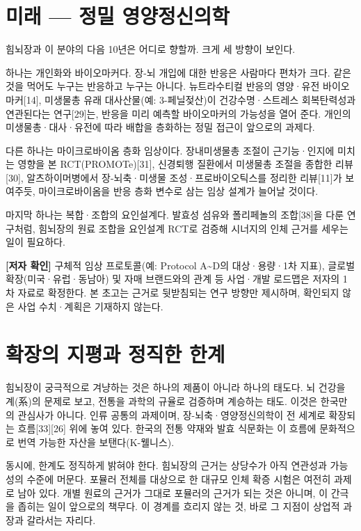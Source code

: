\documentclass[12pt,oneside]{book}
\newenvironment{authnote}
  {\par\smallskip\begingroup\leftskip=6mm\rightskip=3mm\small\color{muted}\noindent\ignorespaces}
  {\par\endgroup\smallskip}
\begin{document}
\section{미래 — 정밀 영양정신의학}

힘뇌장과 이 분야의 다음 10년은 어디로 향할까. 크게 세 방향이 보인다.

하나는 개인화와 바이오마커다. 장-뇌 개입에 대한 반응은 사람마다 편차가 크다. 같은 것을 먹어도 누구는 반응하고 누구는 아니다. 뉴트라수티컬 반응의 영양·유전 바이오마커[14], 미생물총 유래 대사산물(예: 3-페닐젖산)이 건강수명·스트레스 회복탄력성과 연관된다는 연구[29]는, 반응을 미리 예측할 바이오마커의 가능성을 열어 준다. 개인의 미생물총·대사·유전에 따라 배합을 층화하는 정밀 접근이 앞으로의 과제다.

다른 하나는 마이크로바이옴 층화 임상이다. 장내미생물총 조절이 근기능·인지에 미치는 영향을 본 RCT(PROMOTe)[31], 신경퇴행 질환에서 미생물총 조절을 종합한 리뷰[30], 알츠하이머병에서 장-뇌축·미생물 조성·프로바이오틱스를 정리한 리뷰[11]가 보여주듯, 마이크로바이옴을 반응 층화 변수로 삼는 임상 설계가 늘어날 것이다.

마지막 하나는 복합·조합의 요인설계다. 발효성 섬유와 폴리페놀의 조합[38]을 다룬 연구처럼, 힘뇌장의 원료 조합을 요인설계 RCT로 검증해 시너지의 인체 근거를 세우는 일이 필요하다.

\begin{authnote}\textbf{[저자 확인]} 구체적 임상 프로토콜(예: Protocol A\textasciitilde{}D의 대상·용량·1차 지표), 글로벌 확장(미국·유럽·동남아) 및 자매 브랜드와의 관계 등 사업·개발 로드맵은 저자의 1차 자료로 확정한다. 본 초고는 근거로 뒷받침되는 연구 방향만 제시하며, 확인되지 않은 사업 수치·계획은 기재하지 않는다.\end{authnote}

\section{확장의 지평과 정직한 한계}

힘뇌장이 궁극적으로 겨냥하는 것은 하나의 제품이 아니라 하나의 태도다. 뇌 건강을 계(系)의 문제로 보고, 전통을 과학의 규율로 검증하며 계승하는 태도. 이것은 한국만의 관심사가 아니다. 인류 공통의 과제이며, 장-뇌축·영양정신의학이 전 세계로 확장되는 흐름[33][26] 위에 놓여 있다. 한국의 전통 약재와 발효 식문화는 이 흐름에 문화적으로 번역 가능한 자산을 보탠다(K-웰니스).

동시에, 한계도 정직하게 밝혀야 한다. 힘뇌장의 근거는 상당수가 아직 연관성과 가능성의 수준에 머문다. 포뮬러 전체를 대상으로 한 대규모 인체 확증 시험은 여전히 과제로 남아 있다. 개별 원료의 근거가 그대로 포뮬러의 근거가 되는 것은 아니며, 이 간극을 좁히는 일이 앞으로의 책무다. 이 경계를 흐리지 않는 것, 바로 그 지점이 상업적 과장과 갈라서는 자리다.
\end{document}
